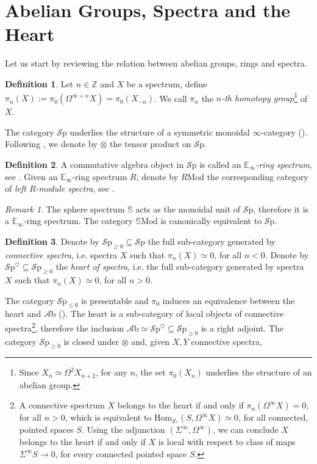 \documentclass[10pt]{amsart}
\newcommand{\bE}{\mathbb{E}}
\newcommand{\s}{\mathscr{S}}
\newcommand{\bS}{\mathbb{S}}
\newcommand{\bZ}{\mathbb{Z}}
\newcommand{\Hom}{\mathrm{Hom}}
\newcommand{\Sp}{\mathscr{S}\mathrm{p}}
\newcommand{\Mod}{\mathrm{Mod}}
\newcommand{\Ab}{\mathscr{A}\mathrm{b}}
\theoremstyle{definition}
\newtheorem{definition}{Definition}
\theoremstyle{remark}
\newtheorem{remark}{Remark}
\begin{document}
\section{Abelian Groups, Spectra and the Heart}
Let us start by reviewing the relation between abelian groups, rings and spectra. 
\begin{definition}
    Let $n\in\bZ$ and $X$ be a spectrum, define $\pi_n(X):=\pi_0(\Omega^{\infty+n}X)=\pi_0(X_{-n})$. We call $\pi_n$ the \textit{$n$-th homotopy group}\footnote{Since $X_n\simeq\Omega^2X_{n+2}$, for any $n$, the set $\pi_0(X_n)$ underlies the structure of an abelian group.} of $X$. 
  \end{definition}
  The category $\Sp$ underlies the structure of a symmetric monoidal $\infty$-category (\cite[Corollary 4.8.2.19]{lurie2017ha}). Following \cite{lurie2017ha}, we denote by $\otimes$ the tensor product on $\Sp$.
  \begin{definition}A commutative algebra object in $\Sp$ is called an \emph{$\bE_\infty$-ring spectrum}, see \cite[Definition 7.1.0.1]{lurie2017ha}. Given an $\bE_\infty$-ring spectrum $R$, denote by $R\Mod$ the corresponding category of \emph{left $R$-module spectra}, see \cite[Definition 7.1.1.2]{lurie2017ha}. 
  \end{definition}
  \begin{remark}
    The sphere spectrum $\bS$ acts as the monoidal unit of $\Sp$, therefore it is a $\bE_\infty$-ring spectrum. The category $\bS\Mod$ is canonically equivalent to $\Sp$. 
  \end{remark}
    \begin{definition}
    Denote by $\Sp_{\geq0}\subseteq\Sp$ the full sub-category generated by \emph{connective spectra}, i.e. spectra $X$ such that $\pi_n(X)\simeq0$, for all $n<0$. Denote by $\Sp^\heartsuit\subseteq\Sp_{\geq0}$ the \emph{heart of spectra}, i.e. the full sub-category generated by spectra $X$ such that $\pi_n(X)\simeq0$, for all $n>0$.
  \end{definition}
  The category $\Sp_{\leq0}$ is presentable and $\pi_0$ induces an equivalence between the heart and $\Ab$ (\cite[Proposition 1.4.3.6]{lurie2017ha}). The heart is a sub-category of local objects of connective spectra\footnote{A connective spectrum $X$ belongs to the heart if and only if $\pi_n(\Omega^\infty X)=0$, for all $n>0$, which is equivalent to $\Hom_{\s_*}(S,\Omega^\infty X)\simeq0$, for all connected, pointed spaces $S$. Using the adjunction $(\Sigma^\infty,\Omega^\infty)$, we can conclude $X$ belongs to the heart if and only if $X$ is local with respect to class of maps $\Sigma^\infty S\to0$, for every connected pointed space $S$.}, therefore the inclusion $\Ab\simeq\Sp^\heartsuit\subseteq\Sp_{\geq0}$ is a right adjoint. The category $\Sp_{\geq0}$ is closed under $\otimes$ and, given $X,Y$ connective spectra, 
\end{document}
